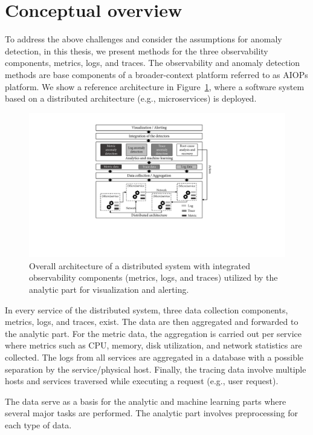 \section{Conceptual overview}\label{ch:concepts:sec:conceptualoverview}
To address the above challenges and consider the assumptions for anomaly detection, in this thesis, we present methods for the three observability components, metrics, logs, and traces.  
The observability and anomaly detection methods are base components of a broader-context platform referred to as AIOPs platform. We show a reference architecture in Figure~\ref{fig:aiopsplatform}, where a software system based on a distributed architecture (e.g., microservices) is deployed. 

\begin{figure}[!t]
\centerline{\includegraphics[scale=0.8]{gfx/chap3/aiopsplatform.pdf}}
\caption{Overall architecture of a distributed system with integrated observability components (metrics, logs, and traces) utilized by the analytic part for visualization and alerting.}
\label{fig:aiopsplatform}
\end{figure}

In every service of the distributed system, three data collection components, metrics, logs, and traces, exist. The data are then aggregated and forwarded to the analytic part. For the metric data, the aggregation is carried out per service where metrics such as CPU, memory, disk utilization, and network statistics are collected. The logs from all services are aggregated in a database with a possible separation by the service/physical host. Finally, the tracing data involve multiple hosts and services traversed while executing a request (e.g., user request). 

The data serve as a basis for the analytic and machine learning parts where several major tasks are performed. The analytic part involves preprocessing for each type of data. 

